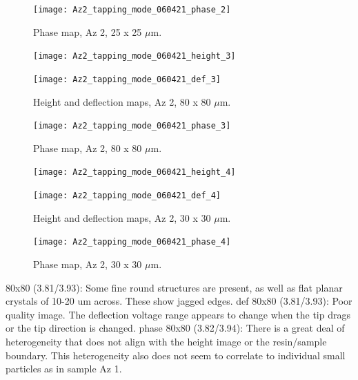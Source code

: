 \begin{figure}[H]
\centering
  \texttt{[image: Az2\_tapping\_mode\_060421\_phase\_2]}
\caption[Phase map, Az 2]{Phase map, Az 2, 25 x 25 $\mu$m.}
\label{fig:afm_az2_phase_2}
\end{figure}

\begin{figure}[H]
\centering
\begin{minipage}{.45\textwidth}
  \centering
  \texttt{[image: Az2\_tapping\_mode\_060421\_height\_3]}
\end{minipage}
\begin{minipage}{.45\textwidth}
  \centering
  \texttt{[image: Az2\_tapping\_mode\_060421\_def\_3]}
\end{minipage}
\caption[Height and deflection maps, Az 2]{Height and deflection maps, Az 2, 80 x 80 $\mu$m.}
\label{fig:afm_az2_height_def_3}
\end{figure}

\begin{figure}[H]
\centering
  \texttt{[image: Az2\_tapping\_mode\_060421\_phase\_3]}
\caption[Phase map, Az 2]{Phase map, Az 2, 80 x 80 $\mu$m.}
\label{fig:afm_az2_phase_3}
\end{figure}

\begin{figure}[H]
\centering
\begin{minipage}{.45\textwidth}
  \centering
  \texttt{[image: Az2\_tapping\_mode\_060421\_height\_4]}
\end{minipage}
\begin{minipage}{.45\textwidth}
  \centering
  \texttt{[image: Az2\_tapping\_mode\_060421\_def\_4]}
\end{minipage}
\caption[Height and deflection maps, Az 2]{Height and deflection maps, Az 2, 30 x 30 $\mu$m.}
\label{fig:afm_az2_height_def_4}
\end{figure}

\begin{figure}[H]
\centering
  \texttt{[image: Az2\_tapping\_mode\_060421\_phase\_4]}
\caption[Phase map, Az 2]{Phase map, Az 2, 30 x 30 $\mu$m.}
\label{fig:afm_az2_phase_4}
\end{figure}




80x80 (3.81/3.93): Some fine round structures are present, as well as flat planar crystals of 10-20 um across. These show jagged edges.
def 80x80 (3.81/3.93): Poor quality image. The deflection voltage range appears to change when the tip drags or the tip direction is changed. 
phase 80x80 (3.82/3.94): There is a great deal of heterogeneity that does not align with the height image or the resin/sample boundary. This heterogeneity also does not seem to correlate to individual small particles as in sample Az 1.

